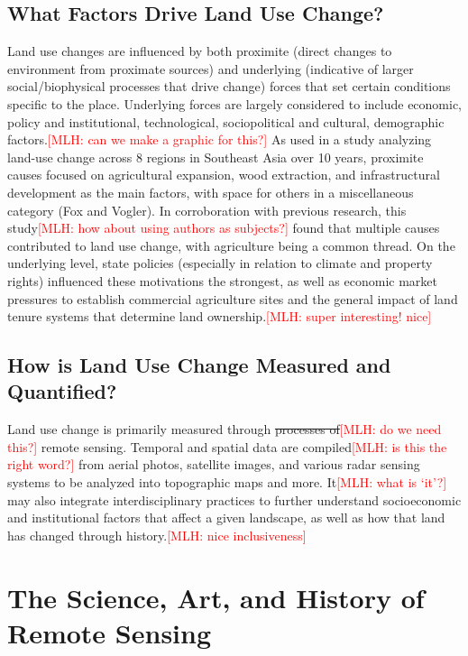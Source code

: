 \documentclass{book}\usepackage{knitr}
\newcommand{\red}[1]{\textcolor{red}{[MLH: #1]}}
\begin{document}
\subsection{What Factors Drive Land Use Change?}

Land use changes are influenced by both proximite (direct changes to environment from proximate sources) and underlying (indicative of larger social/biophysical processes that drive change) forces that set certain conditions specific to the place. Underlying forces are largely considered to include economic, policy and institutional, technological, sociopolitical and cultural, demographic factors.\red{can we make a graphic for this?} As used in a study analyzing land-use change across 8 regions in Southeast Asia over 10 years, proximite causes focused on agricultural expansion, wood extraction, and infrastructural development as the main factors, with space for others in a miscellaneous category (Fox and Vogler). In corroboration with previous research, this study\red{how about using authors as subjects?} found that multiple causes contributed to land use change, with agriculture being a common thread. On the underlying level, state policies (especially in relation to climate and property rights) influenced these motivations the strongest, as well as economic market pressures to establish commercial agriculture sites and the general impact of land tenure systems that determine land ownership.\red{super interesting!  nice}

\subsection{How is Land Use Change Measured and Quantified?}

Land use change is primarily measured through \st{processes of}\red{do we need this?} remote sensing. Temporal and spatial data are compiled\red{is this the right word?} from aerial photos, satellite images, and various radar sensing systems to be analyzed into topographic maps and more. It\red{what is `it'?} may also integrate interdisciplinary practices to further understand socioeconomic and institutional factors that affect a given landscape, as well as how that land has changed through history.\red{nice inclusiveness}

\section{The Science, Art, and History of Remote Sensing}
\end{document}
